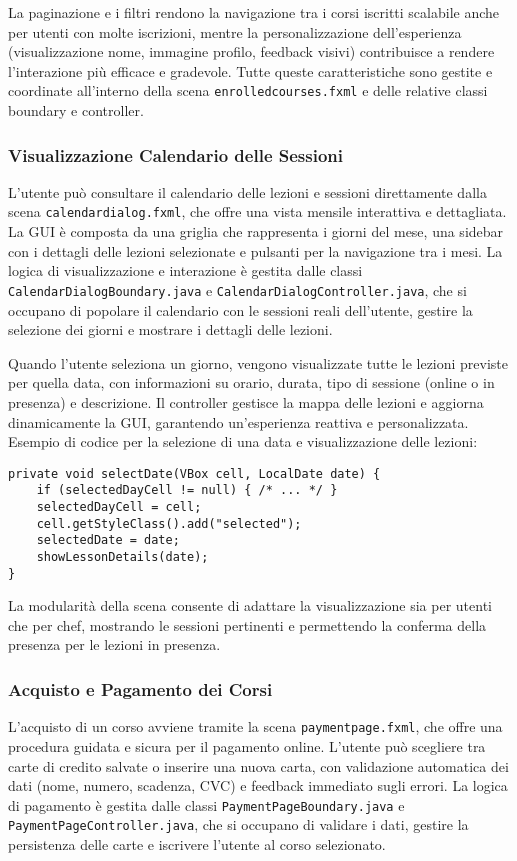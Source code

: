 La paginazione e i filtri rendono la navigazione tra i corsi iscritti scalabile anche per utenti con molte iscrizioni, mentre la personalizzazione dell’esperienza (visualizzazione nome, immagine profilo, feedback visivi) contribuisce a rendere l’interazione più efficace e gradevole. Tutte queste caratteristiche sono gestite e coordinate all’interno della scena \texttt{enrolledcourses.fxml} e delle relative classi boundary e controller.

\subsubsection{Visualizzazione Calendario delle Sessioni}
L'utente può consultare il calendario delle lezioni e sessioni direttamente dalla scena \texttt{calendardialog.fxml}, che offre una vista mensile interattiva e dettagliata. La GUI è composta da una griglia che rappresenta i giorni del mese, una sidebar con i dettagli delle lezioni selezionate e pulsanti per la navigazione tra i mesi. La logica di visualizzazione e interazione è gestita dalle classi \texttt{CalendarDialogBoundary.java} e \texttt{CalendarDialogController.java}, che si occupano di popolare il calendario con le sessioni reali dell'utente, gestire la selezione dei giorni e mostrare i dettagli delle lezioni.

Quando l'utente seleziona un giorno, vengono visualizzate tutte le lezioni previste per quella data, con informazioni su orario, durata, tipo di sessione (online o in presenza) e descrizione. Il controller gestisce la mappa delle lezioni e aggiorna dinamicamente la GUI, garantendo un'esperienza reattiva e personalizzata. Esempio di codice per la selezione di una data e visualizzazione delle lezioni:
\begin{verbatim}
private void selectDate(VBox cell, LocalDate date) {
    if (selectedDayCell != null) { /* ... */ }
    selectedDayCell = cell;
    cell.getStyleClass().add("selected");
    selectedDate = date;
    showLessonDetails(date);
}
\end{verbatim}
La modularità della scena consente di adattare la visualizzazione sia per utenti che per chef, mostrando le sessioni pertinenti e permettendo la conferma della presenza per le lezioni in presenza.

\subsubsection{Acquisto e Pagamento dei Corsi}
L'acquisto di un corso avviene tramite la scena \texttt{paymentpage.fxml}, che offre una procedura guidata e sicura per il pagamento online. L'utente può scegliere tra carte di credito salvate o inserire una nuova carta, con validazione automatica dei dati (nome, numero, scadenza, CVC) e feedback immediato sugli errori. La logica di pagamento è gestita dalle classi \texttt{PaymentPageBoundary.java} e \texttt{PaymentPageController.java}, che si occupano di validare i dati, gestire la persistenza delle carte e iscrivere l'utente al corso selezionato.

